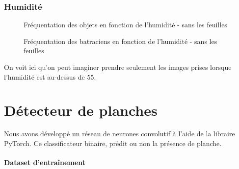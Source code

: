 \subsubsection{Humidité}

\begin{figure}[H]
    \centering
    \caption{Fréquentation des objets en fonction de l'humidité - sans les feuilles}
    \label{fig:Fréquentation des objets en fonction de l'humidité - sans les feuilles}
\end{figure}

\begin{figure}[H]
    \centering
    \caption{Fréquentation des batraciens en fonction de l'humidité - sans les feuilles}
    \label{fig:Fréquentation des batraciens en fonction de l'humidité - sans les feuilles}
\end{figure}

On voit ici qu'on peut imaginer prendre seulement les images prises lorsque l'humidité est au-dessus de 55.


\section{Détecteur de planches}

Nous avons développé un réseau de neurones convolutif à l'aide de la libraire PyTorch. Ce classificateur binaire, prédit ou non la présence de planche.

\paragraph*{Dataset d'entraînement}

